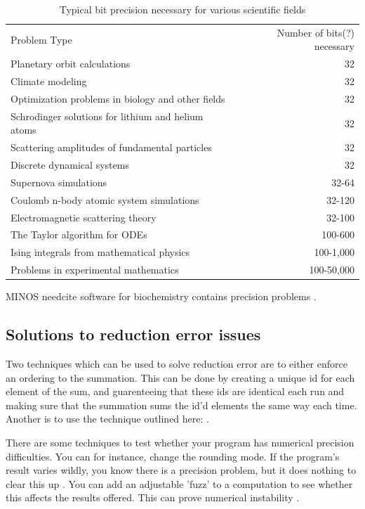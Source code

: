 \documentclass[american]{article}
\newcommand{\needcite}{
	\gls{needcite}
}
\begin{document}
\FloatBarrier
\begin{table}[t]
\caption{Typical bit precision necessary for various scientific fields}\label{tab:precision}
\begin{tabular}{lr}
Problem Type & Number of bits(?) necessary \\
Planetary orbit calculations & 32 \\
Climate modeling & 32 \\
Optimization problems in biology and other fields & 32\\
Schrodinger solutions for lithium and helium atoms & 32\\
Scattering amplitudes of fundamental particles & 32\\
Discrete dynamical systems & 32\\
Supernova simulations & 32-64 \\
Coulomb n-body atomic system simulations & 32-120\\
Electromagnetic scattering theory & 32-100\\
The Taylor algorithm for ODEs & 100-600\\
Ising integrals from mathematical physics & 100-1,000\\
Problems in experimental mathematics & 100-50,000\\
\end{tabular}
\end{table}
\FloatBarrier

MINOS \needcite software for biochemistry contains precision problems \cite{dhb-zurich-hp}.

\subsection{Solutions to reduction error issues} \label{sec:precision-solutions}

Two techniques which can be used to solve reduction error are to either enforce an ordering to the summation. This can be done by creating a unique id for each element of the sum, and guarenteeing that these ids are identical each run and making sure that the summation sums the id'd elements the same way each time. Another is to use the technique outlined here: \cite{repro-fast-sum}.

There are some techniques to test whether your program has numerical precision difficulties. You can for instance, change the rounding mode. If the program's result varies wildly, you know there is a precision problem, but it does nothing to clear this up \cite{dhb-numerical-bugs}. You can add an adjustable 'fuzz' to a computation to see whether this affects the results offered. This can prove numerical instability \cite{dhb-numerical-bugs}.
\end{document}

